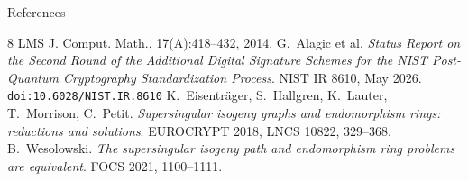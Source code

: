 \documentclass[10pt,aspectratio=169]{beamer}
\begin{document}
\begin{frame}[allowframebreaks]{References}
\begin{thebibliography}{8}
      LMS J. Comput. Math., 17(A):418--432, 2014.
      G.~Alagic et al.
      \emph{Status Report on the Second Round of the Additional Digital Signature Schemes for the
      NIST Post-Quantum Cryptography Standardization Process}.
      NIST IR 8610, May 2026. \texttt{doi:10.6028/NIST.IR.8610}
      K.~Eisentr\"ager, S.~Hallgren, K.~Lauter, T.~Morrison, C.~Petit.
      \emph{Supersingular isogeny graphs and endomorphism rings: reductions and solutions}.
      EUROCRYPT 2018, LNCS 10822, 329--368.
      B.~Wesolowski.
      \emph{The supersingular isogeny path and endomorphism ring problems are equivalent}.
      FOCS 2021, 1100--1111.
  \end{thebibliography}
\end{frame}
\end{document}
